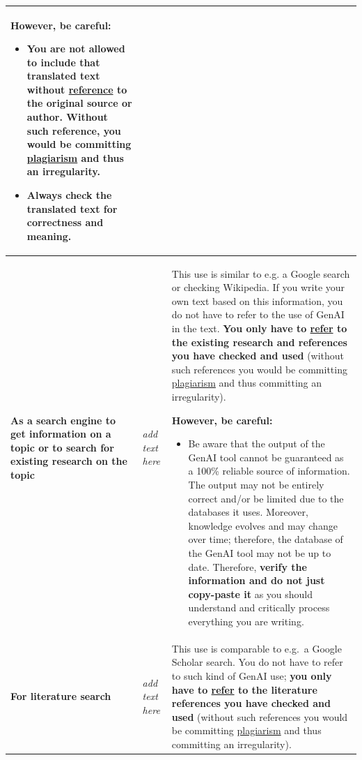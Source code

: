 \begin{longtable}{|p{}|p{}|p{}|}
\textbf{However, be careful:} 
\begin{itemize}
    \item \textbf{You are not allowed to include that translated text without \href{https://bib.kuleuven.be/english/training-and-tutorials/citation}{reference} to the original source or author.} Without such reference, you would be committing \href{https://www.kuleuven.be/english/education/plagiarism/index}{plagiarism} and thus an irregularity.
    \item Always check the translated text for correctness and meaning.
\end{itemize} \\ \hline
\textbf{As a search engine to get information on a topic or to search for existing research on the topic} & \textit{add text here} & This use is similar to e.g. a Google search or checking Wikipedia. If you write your own text based on this information, you do not have to refer to the use of GenAI in the text. \textbf{You only have to \href{https://bib.kuleuven.be/english/training-and-tutorials/citation}{refer} to the existing research and references you have checked and used }(without such references you would be committing \href{https://www.kuleuven.be/english/education/plagiarism/index}{plagiarism} and thus committing an irregularity).

\textbf{However, be careful:}
\begin{itemize}
    \item Be aware that the output of the GenAI tool cannot be guaranteed as a 100\% reliable source of information. The output may not be entirely correct and/or be limited due to the databases it uses. Moreover, knowledge evolves and may change over time; therefore, the database of the GenAI tool may not be up to date. Therefore, \textbf{verify the information and do not just copy-paste it} as you should understand and critically process everything you are writing.
\end{itemize} \\ \hline
\textbf{For literature search} & \textit{add text here} & This use is comparable to e.g.\ a Google Scholar search. You do not have to refer to such kind of GenAI use; \textbf{you only have to \href{https://bib.kuleuven.be/english/training-and-tutorials/citation}{refer} to the literature references you have checked and used} (without such references you would be committing \href{https://www.kuleuven.be/english/education/plagiarism/index}{plagiarism} and thus committing an irregularity).


\end{longtable}
